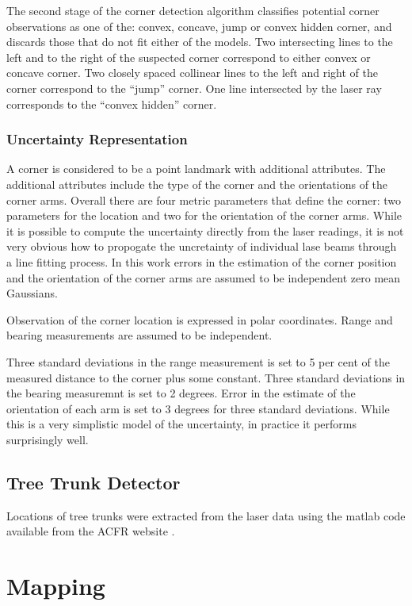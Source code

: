 The second stage of the corner detection algorithm classifies potential
corner observations as one of the: convex, concave, jump or convex
hidden corner, and discards those that do not fit either of the
models. Two intersecting lines to the left and to the right of the
suspected corner correspond to either convex or concave corner. Two
closely spaced collinear lines to the left and right of the corner
correspond to the ``jump'' corner. One line intersected by the laser
ray corresponds to the ``convex hidden'' corner.


\subsubsection{Uncertainty Representation}

A corner is considered to be a point landmark with additional
attributes. The additional attributes include the type of the corner
and the orientations of the corner arms. Overall there are four metric
parameters that define the corner: two parameters for the location and
two for the orientation of the corner arms. While it is possible to
compute the uncertainty directly from the laser readings, it is not
very obvious how to propogate the uncretainty of individual lase beams
through a line fitting process. In this work errors in the estimation
of the corner position and the orientation of the corner arms are
assumed to be independent zero mean Gaussians.

Observation of the corner location is expressed in polar coordinates.
Range and bearing measurements are assumed to be independent. 

Three standard deviations in the range measurement is set to 5 per
cent of the measured distance to the corner plus some constant. Three
standard deviations in the bearing measuremnt is set to 2 degrees.
Error in the estimate of the orientation of each arm is set to 3
degrees for three standard deviations. While this is a very simplistic
model of the uncertainty, in practice it performs surprisingly well.


\subsection{Tree Trunk Detector}

Locations of tree trunks were extracted from the laser data using the
matlab code available from the ACFR website \cite{VP_dataset}.


\section{Mapping}


